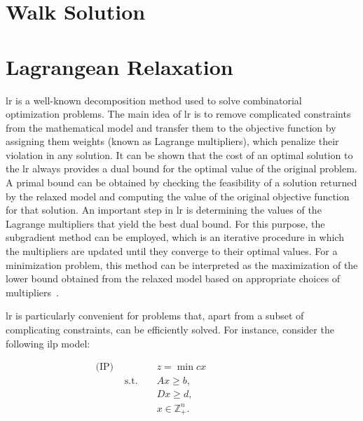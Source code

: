 \section{Walk Solution} \label{sec:cbrp-walk-solution}


\section{Lagrangean Relaxation} \label{sec:cbrp-lagrangean-relaxation}

\gls{lr} is a well-known decomposition method used to solve combinatorial
optimization problems. The main idea of \gls{lr} is to remove complicated
constraints from the mathematical model and transfer them to the objective
function by assigning them weights (known as Lagrange multipliers), which
penalize their violation in any solution. It can be shown that the cost of an
optimal solution to the \gls{lr} always provides a dual bound for the optimal
value of the original problem. A primal bound can be obtained by checking the
feasibility of a solution returned by the relaxed model and computing the value
of the original objective function for that solution. An important step in
\gls{lr} is determining the values of the Lagrange multipliers that yield the
best dual bound. For this purpose, the subgradient method can be employed, which
is an iterative procedure in which the multipliers are updated until they
converge to their optimal values. For a minimization problem, this method can be
interpreted as the maximization of the lower bound obtained from the relaxed
model based on appropriate choices of multipliers~\cite{Beasley:1993}.

\gls{lr} is particularly convenient for problems that, apart from a subset of
complicating constraints, can be efficiently solved. For instance, consider the
following \gls{ilp} model:

\begin{align*}
	\text{(IP) } &              &  & z = \min cx           &  &  &  &  &  &  &  &   \\
	             & \text{s.t. } &  & Ax \geq b,            &  &  &  &  &  &  &  &   \\
	             &              &  & Dx \geq d,            &  &  &  &  &  &  &  &   \\
	             &              &  & x \in \mathbb{Z}^n_+. &  &  &  &  &  &  &  & 
\end{align*}

